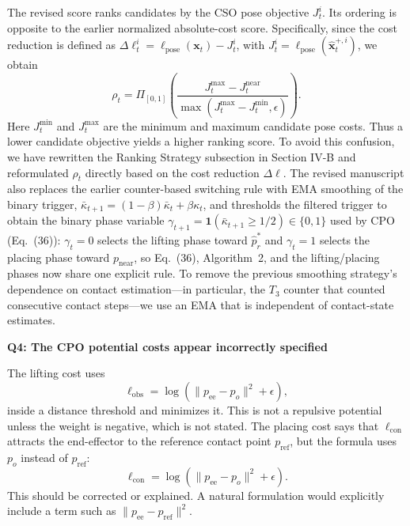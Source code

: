 \documentclass[journal,10pt]{IEEEtran}
\newcommand{\question}[2]{\par\smallskip\noindent
 \color{responseblue}\textbf{Q#1: #2}\par\nobreak\noindent\color{responseblue}}
\begin{document}
The revised score ranks candidates by the CSO pose objective $J_t^i$. Its ordering is opposite to the earlier normalized absolute-cost score. Specifically, since the cost reduction is defined as $\Delta\ell_t^i=\ell_{\mathrm{pose}}(\boldsymbol{x}_t)-J_t^i$, with $J_t^i=\ell_{\mathrm{pose}}(\hat{\boldsymbol{x}}_t^{+,i})$, we obtain
\begin{equation}
\rho_t
=
\Pi_{[0,1]}\!\left(\frac{
J_t^{\mathrm{max}}
-
J_t^{\mathrm{near}}
}{
\max(
J_t^{\mathrm{max}}
-
J_t^{\mathrm{min}},
\epsilon)
}\right). \label{equ:correct_derivation}
\end{equation}
Here $J_t^{\mathrm{min}}$ and $J_t^{\mathrm{max}}$ are the minimum and maximum candidate pose costs. Thus a lower candidate objective yields a higher ranking score. To avoid this confusion, we have rewritten the Ranking Strategy subsection in Section IV-B and reformulated $\rho_t$ directly based on the cost reduction $\Delta\ell$. The revised manuscript also replaces the earlier counter-based switching rule with EMA smoothing of the binary trigger, $\bar{\kappa}_{t+1}=(1-\beta)\bar{\kappa}_t+\beta\kappa_t$, and thresholds the filtered trigger to obtain the binary phase variable $\gamma_{t+1}=\mathbf{1}(\bar{\kappa}_{t+1}\geq 1/2)\in\{0,1\}$ used by CPO (Eq.~(36)): $\gamma_t=0$ selects the lifting phase toward $\hat{p}_r^*$ and $\gamma_t=1$ selects the placing phase toward $p_{\mathrm{near}}$, so Eq.~(36), Algorithm~2, and the lifting/placing phases now share one explicit rule. To remove the previous smoothing strategy's dependence on contact estimation---in particular, the $T_3$ counter that counted consecutive contact steps---we use an EMA that is independent of contact-state estimates.

\question{4}{The CPO potential costs appear incorrectly specified}

The lifting cost uses
\begin{equation}
 \ell_{\text{obs}}=\log(\lVert p_{\text{ee}}-p_o\rVert^2+\epsilon),
\end{equation}
inside a distance threshold and minimizes it. This is not a repulsive potential unless the weight is negative, which is not stated. The placing cost says that $\ell_{\text{con}}$ attracts the end-effector to the reference contact point $p_{\text{ref}}$, but the formula uses $p_o$ instead of $p_{\text{ref}}$:
\begin{equation}
 \ell_{\text{con}}=\log(\lVert p_{\text{ee}}-p_o\rVert^2+\epsilon).
\end{equation}
This should be corrected or explained. A natural formulation would explicitly include a term such as $\lVert p_{\text{ee}}-p_{\text{ref}}\rVert^2$.
\end{document}
